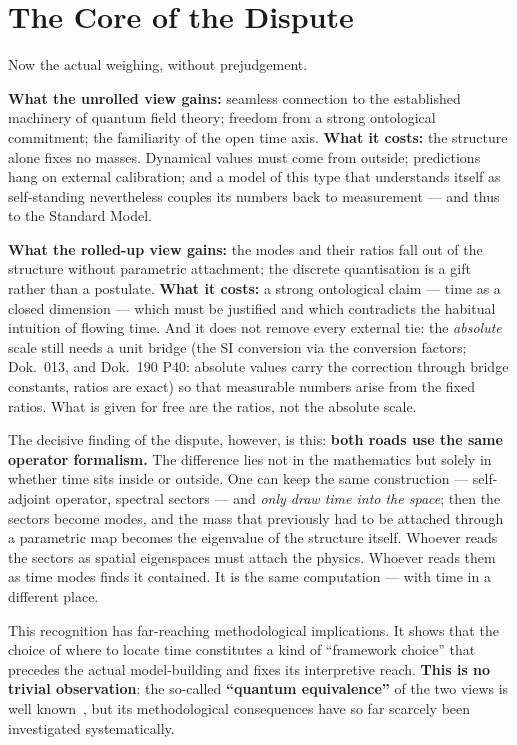 \documentclass[11pt,a4paper]{article}
\begin{document}
\section{The Core of the Dispute}

Now the actual weighing, without prejudgement.

\textbf{What the unrolled view gains:} seamless connection to the established machinery of quantum field theory; freedom from a strong ontological commitment; the familiarity of the open time axis. \textbf{What it costs:} the structure alone fixes no masses. Dynamical values must come from outside; predictions hang on external calibration; and a model of this type that understands itself as self-standing nevertheless couples its numbers back to measurement --- and thus to the Standard Model.

\textbf{What the rolled-up view gains:} the modes and their ratios fall out of the structure without parametric attachment; the discrete quantisation is a gift rather than a postulate. \textbf{What it costs:} a strong ontological claim --- time as a closed dimension --- which must be justified and which contradicts the habitual intuition of flowing time. And it does not remove every external tie: the \emph{absolute} scale still needs a unit bridge (the SI conversion via the conversion factors; Dok.~013, and Dok.~190 P40: absolute values carry the correction through bridge constants, ratios are exact) so that measurable numbers arise from the fixed ratios. What is given for free are the ratios, not the absolute scale.

The decisive finding of the dispute, however, is this: \textbf{both roads use the same operator formalism.} The difference lies not in the mathematics but solely in whether time sits inside or outside. One can keep the same construction --- self-adjoint operator, spectral sectors --- and \emph{only draw time into the space}; then the sectors become modes, and the mass that previously had to be attached through a parametric map becomes the eigenvalue of the structure itself. Whoever reads the sectors as spatial eigenspaces must attach the physics. Whoever reads them as time modes finds it contained. It is the same computation --- with time in a different place.

This recognition has far-reaching methodological implications. It shows that the choice of where to locate time constitutes a kind of ``framework choice'' that precedes the actual model-building and fixes its interpretive reach. \textbf{This is no trivial observation}: the so-called \textbf{``quantum equivalence''} of the two views is well known~\cite{Unruh1995}, but its methodological consequences have so far scarcely been investigated systematically.
\end{document}
